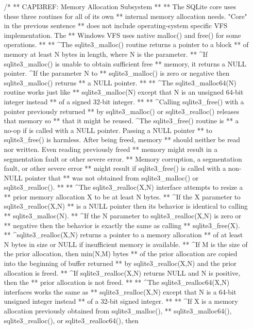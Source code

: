 \begin{Codex}[label=sqlite3.h,numbers=left]
{/*
** CAPI3REF: Memory Allocation Subsystem
**
** The SQLite core uses these three routines for all of its own
** internal memory allocation needs. "Core" in the previous sentence
** does not include operating-system specific VFS implementation.  The
** Windows VFS uses native malloc() and free() for some operations.
**
** ^The sqlite3_malloc() routine returns a pointer to a block
** of memory at least N bytes in length, where N is the parameter.
** ^If sqlite3_malloc() is unable to obtain sufficient free
** memory, it returns a NULL pointer.  ^If the parameter N to
** sqlite3_malloc() is zero or negative then sqlite3_malloc() returns
** a NULL pointer.
**
** ^The sqlite3_malloc64(N) routine works just like
** sqlite3_malloc(N) except that N is an unsigned 64-bit integer instead
** of a signed 32-bit integer.
**
** ^Calling sqlite3_free() with a pointer previously returned
** by sqlite3_malloc() or sqlite3_realloc() releases that memory so
** that it might be reused.  ^The sqlite3_free() routine is
** a no-op if is called with a NULL pointer.  Passing a NULL pointer
** to sqlite3_free() is harmless.  After being freed, memory
** should neither be read nor written.  Even reading previously freed
** memory might result in a segmentation fault or other severe error.
** Memory corruption, a segmentation fault, or other severe error
** might result if sqlite3_free() is called with a non-NULL pointer that
** was not obtained from sqlite3_malloc() or sqlite3_realloc().
**
** ^The sqlite3_realloc(X,N) interface attempts to resize a
** prior memory allocation X to be at least N bytes.
** ^If the X parameter to sqlite3_realloc(X,N)
** is a NULL pointer then its behavior is identical to calling
** sqlite3_malloc(N).
** ^If the N parameter to sqlite3_realloc(X,N) is zero or
** negative then the behavior is exactly the same as calling
** sqlite3_free(X).
** ^sqlite3_realloc(X,N) returns a pointer to a memory allocation
** of at least N bytes in size or NULL if insufficient memory is available.
** ^If M is the size of the prior allocation, then min(N,M) bytes
** of the prior allocation are copied into the beginning of buffer returned
** by sqlite3_realloc(X,N) and the prior allocation is freed.
** ^If sqlite3_realloc(X,N) returns NULL and N is positive, then the
** prior allocation is not freed.
**
** ^The sqlite3_realloc64(X,N) interfaces works the same as
** sqlite3_realloc(X,N) except that N is a 64-bit unsigned integer instead
** of a 32-bit signed integer.
**
** ^If X is a memory allocation previously obtained from sqlite3_malloc(),
** sqlite3_malloc64(), sqlite3_realloc(), or sqlite3_realloc64(), then
}
\end{Codex}
